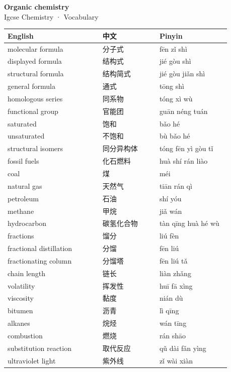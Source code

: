\documentclass[11pt]{article}
\begin{document}
\begin{center}
  {\LARGE\bfseries Organic chemistry}\\[0.35em]
  {\large Igcse Chemistry · Vocabulary}
\end{center}
\vspace{0.6em}

\begin{longtable}{@{}p{0.40\linewidth}p{0.24\linewidth}p{0.30\linewidth}@{}}
\toprule
\textbf{English} & \textbf{中文} & \textbf{Pinyin} \\
\midrule
\endhead
\bottomrule
\endlastfoot
molecular formula & 分子式 & fēn zǐ shì \\
displayed formula & 结构式 & jié gòu shì \\
structural formula & 结构简式 & jié gòu jiǎn shì \\
general formula & 通式 & tōng shì \\
homologous series & 同系物 & tóng xì wù \\
functional group & 官能团 & guān néng tuán \\
saturated & 饱和 & bǎo hé \\
unsaturated & 不饱和 & bù bǎo hé \\
structural isomers & 同分异构体 & tóng fēn yì gòu tǐ \\
fossil fuels & 化石燃料 & huà shí rán liào \\
coal & 煤 & méi \\
natural gas & 天然气 & tiān rán qì \\
petroleum & 石油 & shí yóu \\
methane & 甲烷 & jiǎ wán \\
hydrocarbon & 碳氢化合物 & tàn qīng huà hé wù \\
fractions & 馏分 & liú fèn \\
fractional distillation & 分馏 & fēn liú \\
fractionating column & 分馏塔 & fēn liú tǎ \\
chain length & 链长 & liàn zhǎng \\
volatility & 挥发性 & huī fā xìng \\
viscosity & 黏度 & nián dù \\
bitumen & 沥青 & lì qīng \\
alkanes & 烷烃 & wán tīng \\
combustion & 燃烧 & rán shāo \\
substitution reaction & 取代反应 & qǔ dài fǎn yìng \\
ultraviolet light & 紫外线 & zǐ wài xiàn \\

\end{longtable}
\end{document}
